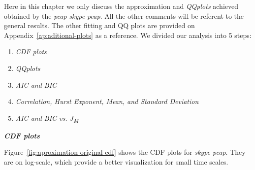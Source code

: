 Here in this chapter we only discuss the approximation and \textit{QQplots} achieved obtained by the \textit{pcap} \textit{skype-pcap}. All the other comments will be referent to the general results. The other fitting and QQ plots are provided on Appendix~\ref{ap:aditional-plots} as a reference. 
We divided our analysis into 5 steps:
\begin{enumerate}
    \item \textit{CDF plots}
    \item \textit{QQplots}
    \item \textit{AIC and BIC}
    \item \textit{Correlation, Hurst Exponent, Mean, and Standard Deviation} 
    \item  \textit{AIC and BIC vs. J\textsubscript{M} }
\end{enumerate} 

\smallskip \noindent \textbf{\textit{CDF plots}}

Figure~\ref{fig:aproximation-original-cdf}  shows the CDF plots for \textit{skype-pcap}. They are on log-scale, which provide a better visualization for small time scales. 


